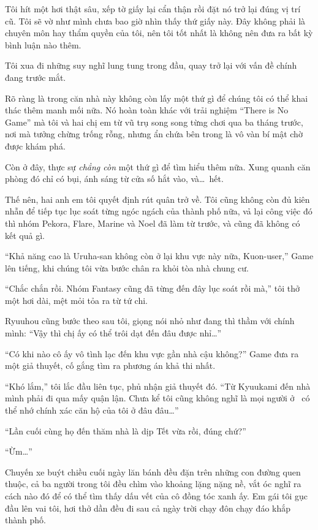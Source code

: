 \documentclass[../main.tex]{subfiles}
\begin{document}
Tôi hít một hơi thật sâu, xếp tờ giấy lại cẩn thận rồi đặt nó trở lại đúng vị trí cũ. Tôi sẽ vờ như mình chưa bao giờ nhìn thấy thứ giấy này. Đây không phải là chuyên môn hay thẩm quyền của tôi, nên tôi tốt nhất là không nên đưa ra bất kỳ bình luận nào thêm.

Tôi xua đi những suy nghĩ lung tung trong đầu, quay trở lại với vấn đề chính đang trước mắt.

Rõ ràng là trong căn nhà này không còn lấy một thứ gì để chúng tôi có thể khai thác thêm manh mối nữa. Nó hoàn toàn khác với trải nghiệm ``There is No Game'' mà tôi và hai chị em từ vũ trụ song song từng chơi qua ba tháng trước, nơi mà tưởng chừng trống rỗng, nhưng ẩn chứa bên trong là vô vàn bí mật chờ được khám phá.

Còn ở đây, thực sự \emph{chẳng còn} một thứ gì để tìm hiểu thêm nữa. Xung quanh căn phòng đó chỉ có bụi, ánh sáng từ cửa số hắt vào, và\dots\ hết.

Thế nên, hai anh em tôi quyết định rút quân trở về. Tôi cũng không còn đủ kiên nhẫn để tiếp tục lục soát từng ngóc ngách của thành phố nữa, vả lại công việc đó thì nhóm Pekora, Flare, Marine và Noel đã làm từ trước, và cũng đã không có kết quả gì.

``Khả năng cao là Uruha-san không còn ở lại khu vực này nữa, Kuon-user,'' Game lên tiếng, khi chúng tôi vừa bước chân ra khỏi tòa nhà chung cư.

``Chắc chắn rồi. Nhóm Fantasy cũng đã từng đến đây lục soát rồi mà,'' tôi thở một hơi dài, mệt mỏi tỏa ra từ tứ chi.

Ryuuhou cũng bước theo sau tôi, giọng nói nhỏ như đang thì thầm với chính mình: ``Vậy thì chị ấy có thể trôi dạt đến đâu được nhỉ\dots''

``Có khi nào cô ấy vô tình lạc đến khu vực gần nhà cậu không?'' Game đưa ra một giả thuyết, cố gắng tìm ra phương án khả thi nhất.

``Khó lắm,'' tôi lắc đầu liên tục, phủ nhận giả thuyết đó. ``Từ Kyuukami đến nhà mình phải đi qua mấy quận lận. Chưa kể tôi cũng không nghĩ là mọi người ở \hll\ có thể nhớ chính xác căn hộ của tôi ở đâu đâu\dots''

``Lần cuối cùng họ đến thăm nhà là dịp Tết vừa rồi, đúng chứ?''

``Ừm\dots''

Chuyến xe buýt chiều cuối ngày lăn bánh đều đặn trên những con đường quen thuộc, cả ba người trong tôi đều chìm vào khoảng lặng nặng nề, vắt óc nghĩ ra cách nào đó để có thể tìm thấy dấu vết của cô đồng tóc xanh ấy. Em gái tôi gục đầu lên vai tôi, hơi thở dần đều đi sau cả ngày trời chạy đôn chạy đáo khắp thành phố.
\end{document}
